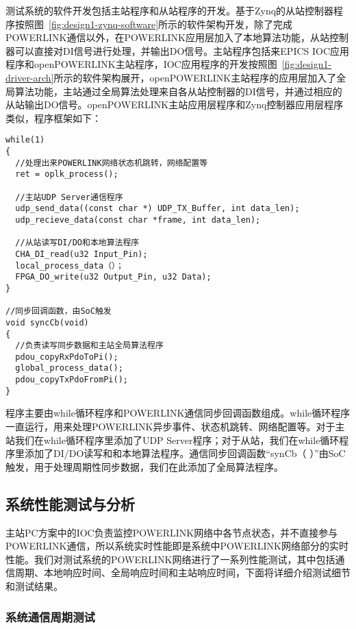 \label{subsubsection:测试系统软件开发}

测试系统的软件开发包括主站程序和从站程序的开发。基于Zynq的从站控制器程序按照图~\ref{fig:design1-zynq-software}所示的软件架构开发，除了完成POWERLINK通信以外，在POWERLINK应用层加入了本地算法功能，从站控制器可以直接对DI信号进行处理，并输出DO信号。主站程序包括来EPICS IOC应用程序和openPOWERLINK主站程序，IOC应用程序的开发按照图~\ref{fig:design1-driver-arch}所示的软件架构展开，openPOWERLINK主站程序的应用层加入了全局算法功能，主站通过全局算法处理来自各从站控制器的DI信号，并通过相应的从站输出DO信号。openPOWERLINK主站应用层程序和Zynq控制器应用层程序类似，程序框架如下：
\begin{lstlisting}
while(1)
{ 
  //处理出来POWERLINK网络状态机跳转，网络配置等
  ret = oplk_process();

  //主站UDP Server通信程序
  udp_send_data((const char *) UDP_TX_Buffer, int data_len);
  udp_recieve_data(const char *frame, int data_len);

  //从站读写DI/DO和本地算法程序
  CHA_DI_read(u32 Input_Pin);
  local_process_data（）；
  FPGA_DO_write(u32 Output_Pin, u32 Data);
}

//同步回调函数，由SoC触发
void syncCb(void)
{
  //负责读写同步数据和主站全局算法程序
  pdou_copyRxPdoToPi();
  global_process_data();
  pdou_copyTxPdoFromPi();
}
\end{lstlisting}

程序主要由while循环程序和POWERLINK通信同步回调函数组成。while循环程序一直运行，用来处理POWERLINK异步事件、状态机跳转、网络配置等。对于主站我们在while循环程序里添加了UDP Server程序；对于从站，我们在while循环程序里添加了DI/DO读写和和本地算法程序。通信同步回调函数“synCb（ ）”由SoC触发，用于处理周期性同步数据，我们在此添加了全局算法程序。


\subsection{系统性能测试与分析}

主站PC方案中的IOC负责监控POWERLINK网络中各节点状态，并不直接参与POWERLINK通信，所以系统实时性能即是系统中POWERLINK网络部分的实时性能。我们对测试系统的POWERLINK网络进行了一系列性能测试，其中包括通信周期、本地响应时间、全局响应时间和主站响应时间，下面将详细介绍测试细节和测试结果。

\subsubsection{系统通信周期测试}

